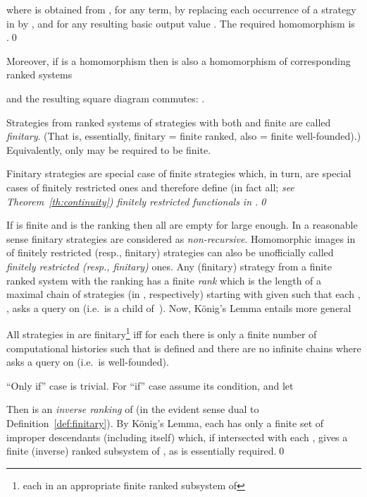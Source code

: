 \documentclass[fleqn]{LMCS}
\theoremstyle{plain}\newtheorem{satz}[thm]{Satz}
\theoremstyle{plain}\newtheorem{hyp}[thm]{Hypothesis}
\theoremstyle{plain}\newtheorem{hyps}[thm]{Hypotheses}
\theoremstyle{definition}\newtheorem{note}[thm]{Note}
\newcommand{\?}{\mbox{?}}
\begin{document}
where  is obtained from , for  any term, by replacing each 
occurrence of a strategy  in  by
, and 
 for any resulting basic output value .  
The required homomorphism is .\qed


\noindent
Moreover, if  is a 
homomorphism 
then  is 
also a homomorphism of corresponding ranked systems 

and the resulting square diagram commutes: 
. 




\begin{defi}\label{def:finitary}Strategies from
ranked systems of strategies  with  
both  and  finite are called \emph{finitary}. 
(That is, essentially, finitary = finite  ranked, also = finite well-founded).) 
Equivalently, only  may be required to be finite. 
\end{defi}

\begin{lem}\label{lemma:finitary-finitely-restricted}
Finitary strategies are special case of finite strategies 
which, in turn, are special cases of finitely restricted ones and therefore 
define (in fact all; \em see Theorem~\ref{th:continuity}\em) finitely restricted 
functionals in .\qed
\end{lem}
\noindent
If  is finite and  is the ranking then all  
are empty for  large enough.
In a reasonable sense 
finitary strategies are considered as \emph{non-recursive}. 
Homomorphic images in  of finitely restricted (resp., finitary) strategies 
can also be unofficially called \emph{finitely restricted (resp., finitary)} ones. 
Any (finitary) strategy  from a finite ranked system 
 with the ranking  
has a finite \emph{rank} 
which is the length  
of a maximal chain  of strategies 
(in , respectively) starting with given  
such that each 
, , asks a query on  
(i.e.\  is a child of~). 
Now, K\"onig's Lemma entails more general
\begin{prop}\label{prop:finitary}
All strategies in  are finitary\footnote{each in an appropriate finite ranked subsystem of 
} 
iff for each  
there is only a finite number of computational histories  such that 
 is defined and there are no infinite chains 
 where  asks a query on  
(i.e.\  is well-founded). 
\end{prop}
\proof
``Only if'' case is trivial. For ``if'' case assume its condition, and let 

Then  
 is an \emph{inverse ranking} 
of  (in the evident sense dual to Definition~\ref{def:finitary}). 
By K\"onig's Lemma, each  has only a finite set  
of improper descendants (including  itself) 
which, if intersected with each , gives a finite (inverse) ranked 
subsystem of , as is essentially required.\qed
\end{document}
